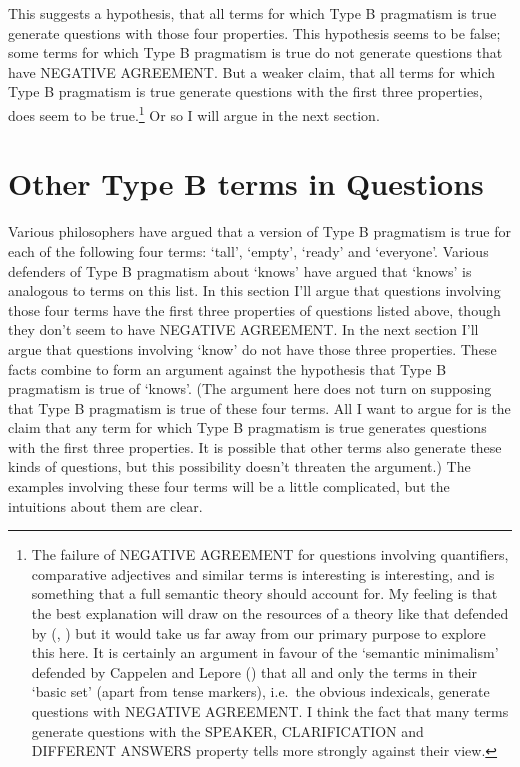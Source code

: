 \documentclass[
  10pt,
  letterpaper,
  DIV=11,
  numbers=noendperiod,
  twoside]{scrartcl}
\begin{document}
This suggests a hypothesis, that all terms for which Type B pragmatism
is true generate questions with those four properties. This hypothesis
seems to be false; some terms for which Type B pragmatism is true do not
generate questions that have NEGATIVE AGREEMENT. But a weaker claim,
that all terms for which Type B pragmatism is true generate questions
with the first three properties, does seem to be true.\footnote{The
  failure of NEGATIVE AGREEMENT for questions involving quantifiers,
  comparative adjectives and similar terms is interesting is
  interesting, and is something that a full semantic theory should
  account for. My feeling is that the best explanation will draw on the
  resources of a theory like that defended by
  (,
  ) but it would take us far away
  from our primary purpose to explore this here. It is certainly an
  argument in favour of the `semantic minimalism' defended by Cappelen
  and Lepore () that all and only the
  terms in their `basic set' (apart from tense markers), i.e.~the
  obvious indexicals, generate questions with NEGATIVE AGREEMENT. I
  think the fact that many terms generate questions with the SPEAKER,
  CLARIFICATION and DIFFERENT ANSWERS property tells more strongly
  against their view.} Or so I will argue in the next section.

\section{Other Type B terms in
Questions}\label{other-type-b-terms-in-questions}

Various philosophers have argued that a version of Type B pragmatism is
true for each of the following four terms: `tall', `empty', `ready' and
`everyone'. Various defenders of Type B pragmatism about `knows' have
argued that `knows' is analogous to terms on this list. In this section
I'll argue that questions involving those four terms have the first
three properties of questions listed above, though they don't seem to
have NEGATIVE AGREEMENT. In the next section I'll argue that questions
involving `know' do not have those three properties. These facts combine
to form an argument against the hypothesis that Type B pragmatism is
true of `knows'. (The argument here does not turn on supposing that Type
B pragmatism is true of these four terms. All I want to argue for is the
claim that any term for which Type B pragmatism is true generates
questions with the first three properties. It is possible that other
terms also generate these kinds of questions, but this possibility
doesn't threaten the argument.) The examples involving these four terms
will be a little complicated, but the intuitions about them are clear.
\end{document}
